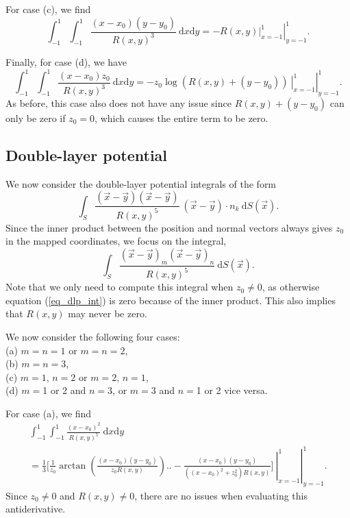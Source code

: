 For case (c), we find
\begin{equation}
\int _{-1}^1\int _{-1}^1
\frac{(x-x_0)(y-y_0) }{R(x,y)^{3}}  \ \text{d}x \text{d}y
= \left. \left.
-R(x,y) \right|_{x=-1}^1 \right|_{y=-1}^1 .
\label{eq_slp_int_xy}
\end{equation}


Finally, for case (d), we have
\begin{equation}
\int_{-1}^1 \int_{-1}^1 \frac{(x-x_0) z_0 }{R(x,y)^{3}}  \ \text{d}x \text{d}y
= \left. \left.
-z_0 \log \left( R(x,y)+  (y-y_0)   \right) \ \right|_{x=-1}^1 \right|_{y=-1}^1 .
\label{eq_slp_int_xz}
\end{equation}
As before, this case also does not have any issue since $R(x,y)+(y-y_0)$ can only be zero if $z_0=0$, which causes the entire term to be zero.  

\subsection{Double-layer potential}

We now consider the double-layer potential integrals of the form
\begin{equation}
 \int_S
 \frac{(\vec{x}-\vec{y})(\vec{x}-\vec{y})     }{R(x,y)^5 }
\ (\vec{x}-\vec{y}) \cdot  n_k    \ \text{d}S(\vec{x}).
\label{eq_dlp_int}
\end{equation}
Since the inner product between the position and normal vectors always gives $z_0$ in the mapped coordinates, we focus on the integral,
\begin{equation}
\int_S
 \frac{(\vec{x}-\vec{y})_m(\vec{x}-\vec{y})_n     }{R(x,y)^5 }
    \ \text{d}S(\vec{x}).
\label{eq_dlp_int2}
\end{equation}
Note that we only need to compute this integral when $z_0\neq 0$, as otherwise equation (\ref{eq_dlp_int})  is zero because of the inner product. This also implies that $R(x,y)$ may never be zero.


We now consider the following four cases: \\ (a) $m=n=1$ or $m=n=2$, \\ (b) $m=n=3$, \\ (c) $m=1$, $n=2$ or $m=2$, $n=1$, \\ (d) $m=$1 or 2 and $n=3$, or $m=3$ and $n=$1 or 2 vice versa. 

For case (a), we find
\begin{align}
  \int_{-1}^1 \int_{-1}^1
  \frac{ (x-x_0)^2 }{R(x,y)^5 }
  \ \text{d}x \text{d}y
  \nonumber \\
  =
  \frac{1}{3} 
  \biggl[
  \frac{1}{z_0}\arctan \left(\frac{(x-x_0)(y-y_0)}{z_0 R(x,y)}\right) \biggr.
  \left. \left. \biggl. -\frac{(x-x_0) (y-y_0)}{\left((x-x_0)^2+z_0^2\right) R(x,y)}
  \biggr]   \ \right|_{x=-1}^1 \right|_{y=-1}^1 .
\label{eq_dlp_int_xx}
\end{align}
Since $z_0\neq0$ and $R(x,y) \neq 0$, there are no issues when evaluating this antiderivative. 

